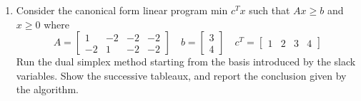 \documentclass{article}
\begin{document}
\begin{enumerate}
	\item Consider the canonical form linear program min $c^T x$ such that $Ax\ge b$ and $x\ge 0$ where \[A=\begin{bmatrix}
				1 & -2 & -2 & -2 \\
				-2 & 1 & -2 & -2
			\end{bmatrix}\quad b=\begin{bmatrix}
				3 \\ 4
			\end{bmatrix}\quad c^T=\begin{bmatrix}
				1 & 2 & 3 & 4
		\end{bmatrix}\] Run the dual simplex method starting from the basis introduced by the slack variables. Show the successive tableaux, and report the conclusion given by the algorithm.
		
\end{enumerate}
\end{document}
